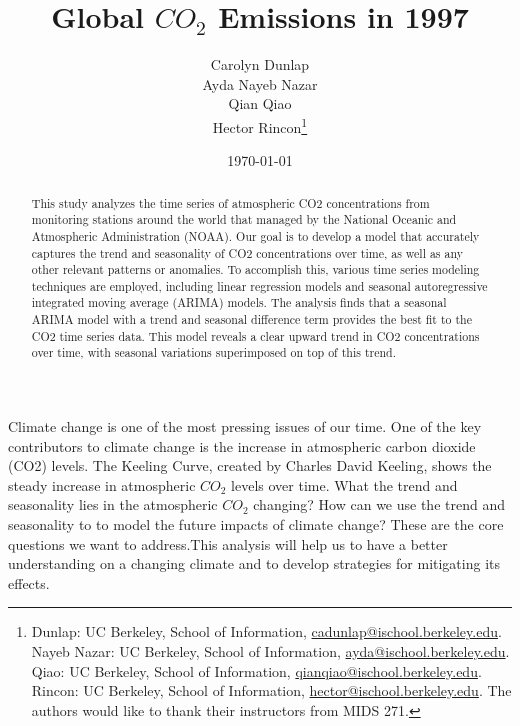 \documentclass[AER]{AEA}
\begin{document}
\title{Global \(CO_{2}\) Emissions in 1997}


\author{
  Carolyn Dunlap\\
  Ayda Nayeb Nazar\\
  Qian Qiao\\
  Hector Rincon\thanks{
  Dunlap: UC Berkeley, School of
Information, \href{mailto:cadunlap@ischool.berkeley.edu}{cadunlap@ischool.berkeley.edu}.
  Nayeb Nazar: UC Berkeley, School of
Information, \href{mailto:ayda@ischool.berkeley.edu}{ayda@ischool.berkeley.edu}.
  Qiao: UC Berkeley, School of
Information, \href{mailto:qianqiao@ischool.berkeley.edu}{qianqiao@ischool.berkeley.edu}.
  Rincon: UC Berkeley, School of
Information, \href{mailto:hector@ischool.berkeley.edu}{hector@ischool.berkeley.edu}.
  The authors would like to thank their instructors from MIDS 271.
}
}

\date{\today}
\JEL{}

\begin{abstract}
This study analyzes the time series of atmospheric CO2 concentrations
from monitoring stations around the world that managed by the National
Oceanic and Atmospheric Administration (NOAA). Our goal is to develop a
model that accurately captures the trend and seasonality of CO2
concentrations over time, as well as any other relevant patterns or
anomalies. To accomplish this, various time series modeling techniques
are employed, including linear regression models and seasonal
autoregressive integrated moving average (ARIMA) models. The analysis
finds that a seasonal ARIMA model with a trend and seasonal difference
term provides the best fit to the CO2 time series data. This model
reveals a clear upward trend in CO2 concentrations over time, with
seasonal variations superimposed on top of this trend.
\end{abstract}


\maketitle

Climate change is one of the most pressing issues of our time. One of
the key contributors to climate change is the increase in atmospheric
carbon dioxide (CO2) levels. The Keeling Curve, created by Charles David
Keeling, shows the steady increase in atmospheric \(CO_{2}\) levels over
time. What the trend and seasonality lies in the atmospheric \(CO_{2}\)
changing? How can we use the trend and seasonality to to model the
future impacts of climate change? These are the core questions we want
to address.This analysis will help us to have a better understanding on
a changing climate and to develop strategies for mitigating its effects.
\end{document}
